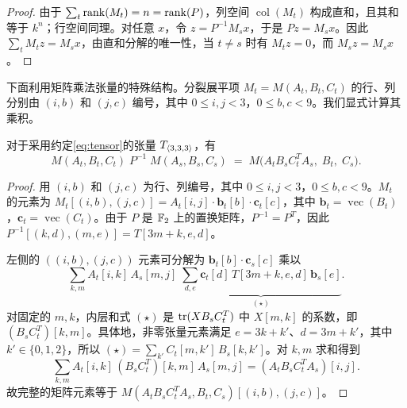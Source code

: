 \documentclass[11pt,a4paper]{article}
\begin{document}
\begin{proof}
  由于 $\sum_t\operatorname{rank}(M_t)=n=\operatorname{rank}(P)$，列空间 $\operatorname{col}(M_t)$ 构成直和，且其和等于 $k^n$；行空间同理。对任意 $x$，令 $z=P^{-1}M_sx$，于是 $Pz=M_sx$。因此 $\sum_tM_tz=M_sx$，由直和分解的唯一性，当 $t\ne s$ 时有 $M_tz=0$，而 $M_sz=M_sx$。
\end{proof}

下面利用矩阵乘法张量的特殊结构。分裂展平项 $M_t=M(A_t,B_t,C_t)$ 的行、列分别由 $(i,b)$ 和 $(j,c)$ 编号，其中 $0\le i,j<3$，$0\le b,c<9$。我们显式计算其乘积。

\begin{proposition}[乘积恒等式]\label{prop:product}
  对于采用约定\eqref{eq:tensor}的张量 $T_{\langle3,3,3\rangle}$，有
  \begin{equation}\label{eq:product}
    M(A_t,B_t,C_t)\;P^{-1}\;M(A_s,B_s,C_s)
    \;=\;M\bigl(A_tB_sC_t^TA_s,\;B_t,\;C_s\bigr).
  \end{equation}
\end{proposition}

\begin{proof}
  用 $(i,b)$ 和 $(j,c)$ 为行、列编号，其中 $0\le i,j<3$，$0\le b,c<9$。$M_t$ 的元素为 $M_t[(i,b),(j,c)]=A_t[i,j]\cdot\mathbf{b}_t[b]\cdot\mathbf{c}_t[c]$，其中 $\mathbf{b}_t=\operatorname{vec}(B_t)$，$\mathbf{c}_t=\operatorname{vec}(C_t)$。由于 $P$ 是 $\mathbb{F}_2$ 上的置换矩阵，$P^{-1}=P^T$，因此 $P^{-1}[(k,d),(m,e)]=T[3m+k,e,d]$。

  左侧的 $((i,b),(j,c))$ 元素可分解为 $\mathbf{b}_t[b]\cdot\mathbf{c}_s[c]$ 乘以
  \[
    \sum_{k,m}A_t[i,k]\,A_s[m,j]\;\underbrace{\sum_{d,e}\mathbf{c}_t[d]\,T[3m+k,e,d]\,\mathbf{b}_s[e]}_{(\star)}.
  \]
  对固定的 $m,k$，内层和式 $(\star)$ 是 $\operatorname{tr}(XB_sC_t^T)$ 中 $X[m,k]$ 的系数，即 $(B_sC_t^T)[k,m]$。具体地，非零张量元素满足 $e=3k+k'$、$d=3m+k'$，其中 $k'\in\{0,1,2\}$，所以 $(\star)=\sum_{k'}C_t[m,k']\,B_s[k,k']$。对 $k,m$ 求和得到
  \[
    \sum_{k,m}A_t[i,k]\,(B_sC_t^T)[k,m]\,A_s[m,j]=(A_tB_sC_t^TA_s)[i,j].
  \]
  故完整的矩阵元素等于 $M(A_tB_sC_t^TA_s,B_t,C_s)[(i,b),(j,c)]$。
\end{proof}
\end{document}
